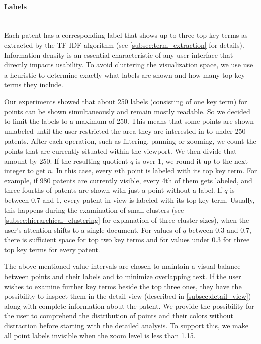 \paragraph{Labels}~\\
Each patent has a corresponding label that shows up to three top key terms as extracted by the TF-IDF algorithm (see  \autoref{subsec:term_extraction} for details).
Information density is an essential characteristic of any user interface that directly impacts usability.
To avoid cluttering the visualization space, we use use a heuristic to determine exactly what labels are shown and how many top key terms they include.

Our experiments showed that about 250 labels (consisting of one key term) for points can be shown simultaneously and remain mostly readable. 
So we decided to limit the labels to a maximum of 250.
This means that some points are shown unlabeled until the user restricted the area they are interested in to under 250 patents.
After each operation, such as filtering, panning or zooming, we count the points that are currently situated within the viewport.
We then divide that amount by 250.
If the resulting quotient $q$ is over 1, we round it up to the next integer to get $n$.
In this case, every $n$th point is labeled with its top key term. 
For example, if 980 patents are currently visible, every 4th of them gets labeled, and three-fourths of patents are shown with just a point without a label.
If $q$ is between 0.7 and 1, every patent in view is labeled with its top key term.
Usually, this happens during the examination of small clusters (see \autoref{subsec:hierarchical_clustering} for explanation of three cluster sizes), when the user's attention shifts to a single document.
For values of $q$ between 0.3 and 0.7, there is sufficient space for top two key terms and for values under 0.3 for three top key terms for every patent.

The above-mentioned value intervals are chosen to maintain a visual balance between points and their labels and to minimize overlapping text.
If the user wishes to examine further key terms beside the top three ones, they have the possibility to inspect them in the detail view (described in \autoref{subsec:detail_view}) along with complete information about the patent.
We provide the possibility for the user to comprehend the distribution of points and their colors without distraction before starting with the detailed analysis. 
To support this, we make all point labels invisible when the zoom level is less than 1.15.

